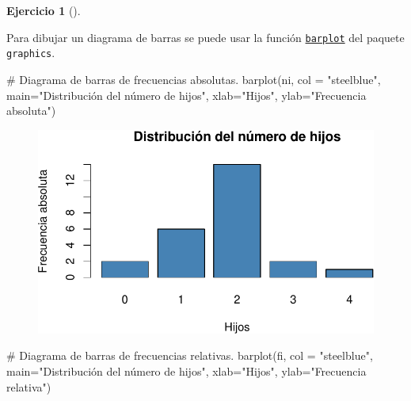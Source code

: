 \documentclass[
  a4paper,
]{scrreport}
\newenvironment{Shaded}{\begin{snugshade}}{\end{snugshade}}
\newcommand{\AttributeTok}[1]{\textcolor[rgb]{0.40,0.45,0.13}{#1}}
\newcommand{\CommentTok}[1]{\textcolor[rgb]{0.37,0.37,0.37}{#1}}
\newcommand{\FunctionTok}[1]{\textcolor[rgb]{0.28,0.35,0.67}{#1}}
\newcommand{\NormalTok}[1]{\textcolor[rgb]{0.00,0.23,0.31}{#1}}
\newcommand{\StringTok}[1]{\textcolor[rgb]{0.13,0.47,0.30}{#1}}
\theoremstyle{definition}
\newtheorem{exercise}{Ejercicio}[chapter]
\theoremstyle{remark}
\begin{document}
\begin{exercise}[]
\begin{tcolorbox}[enhanced jigsaw, coltitle=black, breakable, bottomtitle=1mm, colbacktitle=quarto-callout-tip-color!10!white, rightrule=.15mm, opacityback=0, opacitybacktitle=0.6, left=2mm, colframe=quarto-callout-tip-color-frame, title=\textcolor{quarto-callout-tip-color}{\faLightbulb}\hspace{0.5em}{Solución 1}, toprule=.15mm, toptitle=1mm, arc=.35mm, colback=white, titlerule=0mm, bottomrule=.15mm, leftrule=.75mm]

Para dibujar un diagrama de barras se puede usar la función
\href{https://www.rdocumentation.org/packages/graphics/versions/3.6.2/topics/barplot}{\texttt{barplot}}
del paquete \texttt{graphics}.

\begin{Shaded}
\begin{Highlighting}[]
\CommentTok{\# Diagrama de barras de frecuencias absolutas.}
\FunctionTok{barplot}\NormalTok{(ni, }\AttributeTok{col =} \StringTok{"steelblue"}\NormalTok{, }\AttributeTok{main=}\StringTok{"Distribución del número de hijos"}\NormalTok{, }\AttributeTok{xlab=}\StringTok{"Hijos"}\NormalTok{, }\AttributeTok{ylab=}\StringTok{"Frecuencia absoluta"}\NormalTok{)}
\end{Highlighting}
\end{Shaded}

\begin{figure}[H]

{\centering \includegraphics{./03-frecuencias-graficos_files/figure-pdf/unnamed-chunk-6-1.pdf}

}

\end{figure}

\begin{Shaded}
\begin{Highlighting}[]
\CommentTok{\# Diagrama de barras de frecuencias relativas.}
\FunctionTok{barplot}\NormalTok{(fi, }\AttributeTok{col =} \StringTok{"steelblue"}\NormalTok{, }\AttributeTok{main=}\StringTok{"Distribución del número de hijos"}\NormalTok{, }\AttributeTok{xlab=}\StringTok{"Hijos"}\NormalTok{, }\AttributeTok{ylab=}\StringTok{"Frecuencia relativa"}\NormalTok{)}
\end{Highlighting}
\end{Shaded}


\end{tcolorbox}
\end{exercise}
\end{document}
